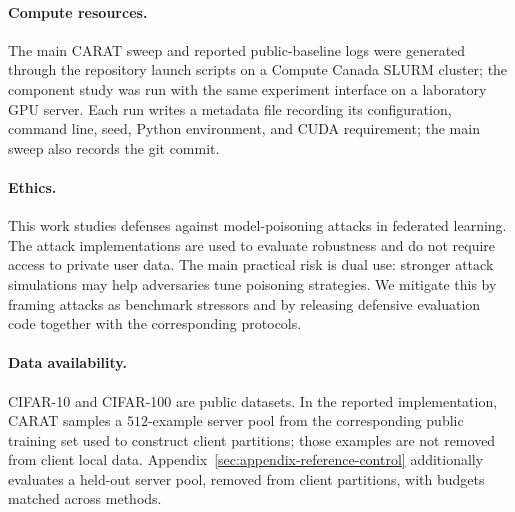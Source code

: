 \paragraph{Compute resources.}
The main CARAT sweep and reported public-baseline logs were generated through the repository launch scripts on a Compute Canada SLURM cluster; the component study was run with the same experiment interface on a laboratory GPU server. Each run writes a metadata file recording its configuration, command line, seed, Python environment, and CUDA requirement; the main sweep also records the git commit.

\paragraph{Ethics.}
This work studies defenses against model-poisoning attacks in federated learning. The attack implementations are used to evaluate robustness and do not require access to private user data. The main practical risk is dual use: stronger attack simulations may help adversaries tune poisoning strategies. We mitigate this by framing attacks as benchmark stressors and by releasing defensive evaluation code together with the corresponding protocols.

\paragraph{Data availability.}
CIFAR-10 and CIFAR-100 are public datasets. In the reported implementation, CARAT samples a $512$-example server pool from the corresponding public training set used to construct client partitions; those examples are not removed from client local data. Appendix~\ref{sec:appendix-reference-control} additionally evaluates a held-out server pool, removed from client partitions, with budgets matched across methods.
